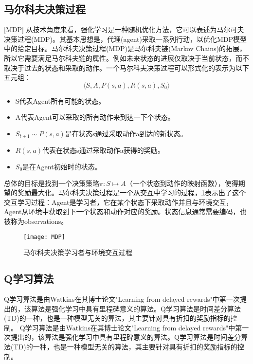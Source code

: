 \subsection{马尔科夫决策过程}[MDP]
从技术角度来看，强化学习是一种随机优化方法，它可以表述为马尔可夫决策过程(MDP)\cite{MDP}。其基本思想是，代理(agent)采取一系列行动，以优化MDP模型中的给定目标。马尔科夫决策过程(MDP)是马尔科夫链(Markov Chains)的拓展，所以它需要满足马尔科夫链的属性。例如未来状态的进展仅取决于当前状态，而不取决于过去的状态和采取的动作。一个马尔科夫决策过程可以形式化的表示为以下五元组：
\begin{equation}\label{MDP5}
\langle S, A, P(s,a),R(s,a),S_0 \rangle
\end{equation}
\begin{itemize}
    \item S代表Agent所有可能的状态。
    \item A代表Agent可以采取的所有动作来到达一下个状态。
    \item $S_{t+1}\sim P(s,a)$是在状态s通过采取动作a到达的新状态。
    \item $R(s,a)$代表在状态s通过采取动作a获得的奖励。
    \item $S_0$是在Agent初始时的状态。
\end{itemize}

总体的目标是找到一个决策策略$\pi :S\longmapsto A$（一个状态到动作的映射函数），使得期望的奖励最大化。马尔科夫决策过程是一个从交互中学习的过程，\ref{Interaction}表示出了这个交互学习过程：Agent是学习者，它在某个状态下采取动作并且与环境交互，Agent从环境中获取到下一个状态和动作对应的奖励。状态信息通常需要编码，也被称为observations。
\begin{figure}[h]
    \centering
    \texttt{[image: MDP]}
    \caption{马尔科夫决策学习者与环境交互过程}
    \label{Interaction}
\end{figure}

\subsection{Q学习算法}
Q学习算法\cite{QLearning2}是由Watkins在其博士论文"Learning from delayed rewards"\cite{QLearning0}中第一次提出的，该算法是强化学习中具有里程碑意义的算法。Q学习算法是时间差分算法(TD)\cite{QLearning1}的一种，也是一种模型无关的算法，其主要针对具有折扣的奖励指标的控制。
Q学习算法\cite{QLearning2}是由Watkins在其博士论文"Learning from delayed rewards"\cite{QLearning0}中第一次提出的，该算法是强化学习中具有里程碑意义的算法。Q学习算法是时间差分算法(TD)\cite{QLearning1}的一种，也是一种模型无关的算法，其主要针对具有折扣的奖励指标的控制。

